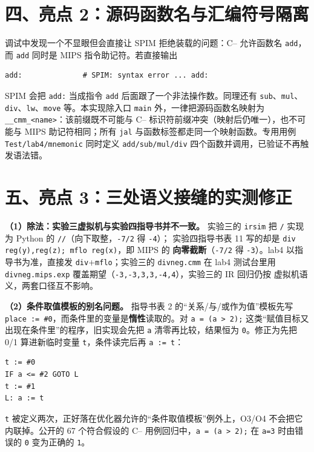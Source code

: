 \documentclass[11pt,a4paper]{ctexart}
\newcommand{\code}[1]{\texttt{#1}}
\begin{document}
\section*{四、亮点 2：源码函数名与汇编符号隔离}

调试中发现一个不显眼但会直接让 SPIM 拒绝装载的问题：C-- 允许函数名 \code{add}，
而 \code{add} 同时是 MIPS 指令助记符。若直接输出

\begin{lstlisting}
add:              # SPIM: syntax error ... add:
\end{lstlisting}

SPIM 会把 \code{add:} 当成指令 \code{add} 后面跟了一个非法操作数。同理还有
\code{sub}、\code{mul}、\code{div}、\code{lw}、\code{move} 等。本实现除入口
\code{main} 外，一律把源码函数名映射为 \code{\_\_cmm\_<name>}：该前缀既不可能与
C-- 标识符前缀冲突（映射后仍唯一），也不可能与 MIPS 助记符相同；所有 \code{jal}
与函数标签都走同一个映射函数。专用用例 \code{Test/lab4/mnemonic} 同时定义
\code{add/sub/mul/div} 四个函数并调用，已验证不再触发语法错。

\section*{五、亮点 3：三处语义接缝的实测修正}

\textbf{（1）除法：实验三虚拟机与实验四指导书并不一致。} 实验三的 \code{irsim}
把 \code{/} 实现为 Python 的 \code{//}（向下取整，\code{-7/2} 得 \code{-4}）；
实验四指导书表 11 写的却是 \code{div reg(y),reg(z); mflo reg(x)}，即 MIPS 的
\textbf{向零截断}（\code{-7/2} 得 \code{-3}）。lab4 以指导书为准，直接发
\code{div}+\code{mflo}；实验三的 \code{divneg.cmm} 在 lab4 测试台里用
\code{divneg.mips.exp} 覆盖期望（\code{-3,-3,3,3,-4,4}），实验三的 IR 回归仍按
虚拟机语义，两套口径互不影响。

\textbf{（2）条件取值模板的别名问题。} 指导书表 2 的“关系/与/或作为值”模板先写
\code{place := \#0}，而条件里的变量是\textbf{惰性}读取的。对 \code{a = (a > 2);}
这类“赋值目标又出现在条件里”的程序，旧实现会先把 \code{a} 清零再比较，结果恒为
\code{0}。修正为先把 0/1 算进新临时变量 \code{t}，条件读完后再 \code{a := t}：

\begin{lstlisting}
t := #0
IF a <= #2 GOTO L
t := #1
L: a := t
\end{lstlisting}

\code{t} 被定义两次，正好落在优化器允许的“条件取值模板”例外上，O3/O4 不会把它
内联掉。公开的 67 个符合假设的 C-- 用例回归中，\code{a = (a > 2);} 在 \code{a=3}
时由错误的 \code{0} 变为正确的 \code{1}。
\end{document}
